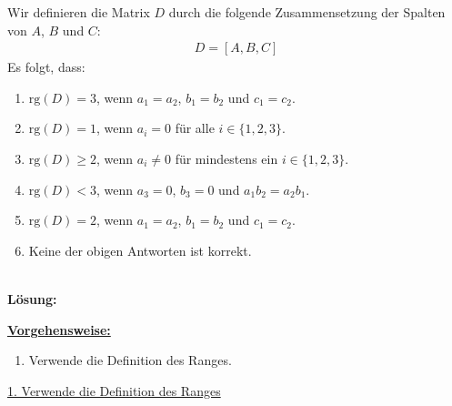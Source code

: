 Wir definieren die Matrix $D$ durch die folgende Zusammensetzung der Spalten von $A$, $B$ und $C$:
\begin{align*}
	D = [A,B,C]
\end{align*}
Es folgt, dass:
\renewcommand{\labelenumi}{(\alph{enumi})}
\begin{enumerate}
	\item 
	$ \mathrm{rg}(D) = 3 $, wenn $a_1 = a_2$, $b_1 = b_2$ und $c_1 = c_2$.
	\item
	$ \mathrm{rg}(D) = 1 $, wenn $ a_i = 0 $ für alle $ i \in \{1,2,3\} $.
	\item
	$ \mathrm{rg}(D) \geq  2 $, wenn $ a_i \neq 0 $ für mindestens ein $ i \in \{1,2,3\} $.
	\item
	$ \mathrm{rg}(D) < 3 $, wenn $a_3 = 0$, $b_3 = 0$ und $a_1 b_2 = a_2 b_1$. 
	\item
	$ \mathrm{rg}(D) = 2 $, wenn $a_1 = a_2$, $b_1 = b_2$ und $c_1 = c_2$.
	\item 
	Keine der obigen Antworten ist korrekt.
\end{enumerate}
\ \\
\textbf{Lösung:}
\begin{mdframed}
\underline{\textbf{Vorgehensweise:}}
\renewcommand{\labelenumi}{\theenumi.}
\begin{enumerate}
\item Verwende die Definition des Ranges.
\end{enumerate}
\end{mdframed}

\underline{1. Verwende die Definition des Ranges}\\



\newpage

